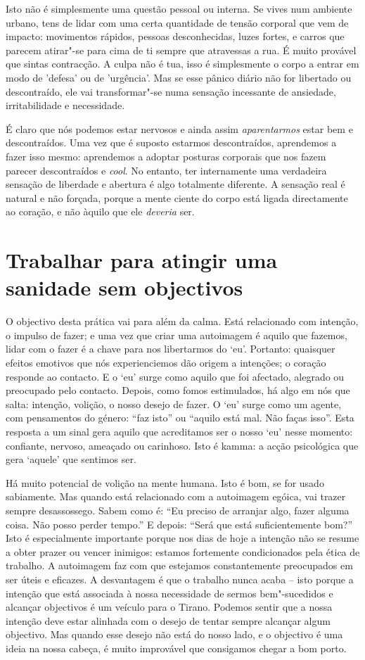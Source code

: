 Isto não é simplesmente uma questão pessoal ou interna. Se vives num
ambiente urbano, tens de lidar com uma certa quantidade de tensão
corporal que vem de impacto: movimentos rápidos, pessoas desconhecidas,
luzes fortes, e carros que parecem atirar"-se para cima de ti sempre que
atravessas a rua. É muito provável que sintas contracção. A culpa não é
tua, isso é simplesmente o corpo a entrar em modo de 'defesa' ou de
'urgência'. Mas se esse pânico diário não for libertado ou descontraído,
ele vai transformar"-se numa sensação incessante de ansiedade,
irritabilidade e necessidade.

É claro que nós podemos estar nervosos e ainda assim \emph{aparentarmos}
estar bem e descontraídos. Uma vez que é suposto estarmos descontraídos,
aprendemos a fazer isso mesmo: aprendemos a adoptar posturas corporais
que nos fazem parecer descontraídos e \emph{cool}. No entanto, ter
internamente uma verdadeira sensação de liberdade e abertura é algo
totalmente diferente. A sensação real é natural e não forçada, porque a
mente ciente do corpo está ligada directamente ao coração, e não àquilo
que ele \emph{deveria} ser.

\section{Trabalhar para atingir uma sanidade sem objectivos}

O objectivo desta prática vai para além da calma. Está relacionado com
intenção, o impulso de fazer; e uma vez que criar uma autoimagem é
aquilo que fazemos, lidar com o fazer é a chave para nos libertarmos do
`eu'. Portanto: quaisquer efeitos emotivos que nós experienciemos dão
origem a intenções; o coração responde ao contacto. E o `eu' surge como
aquilo que foi afectado, alegrado ou preocupado pelo contacto. Depois,
como fomos estimulados, há algo em nós que salta: intenção, volição, o
nosso desejo de fazer. O `eu' surge como um agente, com pensamentos do
género: “faz isto” ou “aquilo está mal. Não faças isso”. Esta resposta a
um sinal gera aquilo que acreditamos ser o nosso `eu' nesse momento:
confiante, nervoso, ameaçado ou carinhoso. Isto é kamma: a acção
psicológica que gera `aquele' que sentimos ser.

Há muito potencial de volição na mente humana. Isto é bom, se for usado
sabiamente. Mas quando está relacionado com a autoimagem egóica, vai
trazer sempre desassossego. Sabem como é: “Eu preciso de arranjar algo,
fazer alguma coisa. Não posso perder tempo.” E depois: “Será que está
suficientemente bom?” Isto é especialmente importante porque nos dias de
hoje a intenção não se resume a obter prazer ou vencer inimigos: estamos
fortemente condicionados pela ética de trabalho. A autoimagem faz com
que estejamos constantemente preocupados em ser úteis e eficazes. A
desvantagem é que o trabalho nunca acaba -- isto porque a intenção que
está associada à nossa necessidade de sermos bem"-sucedidos e alcançar
objectivos é um veículo para o Tirano. Podemos sentir que a nossa
intenção deve estar alinhada com o desejo de tentar sempre alcançar
algum objectivo. Mas quando esse desejo não está do nosso lado, e o
objectivo é uma ideia na nossa cabeça, é muito improvável que consigamos
chegar a bom porto.

